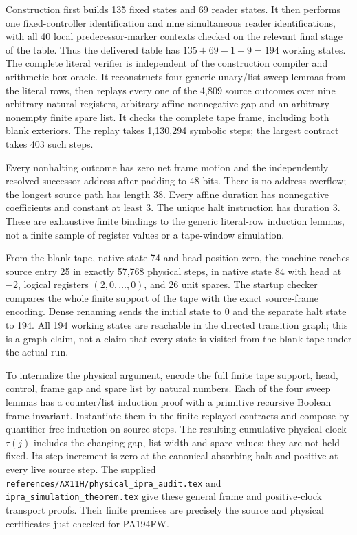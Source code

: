Construction first builds 135 fixed states and 69 reader states.  It
then performs one fixed-controller identification and nine simultaneous
reader identifications, with all 40 local predecessor-marker contexts
checked on the relevant final stage of the table.  Thus the delivered
table has $135+69-1-9=194$ working states.  The complete literal
verifier is independent of the construction compiler and arithmetic-box
oracle.  It reconstructs four generic unary/list sweep lemmas from the
literal rows, then replays every one of the 4,809 source outcomes over
nine arbitrary natural registers, arbitrary affine nonnegative gap and
an arbitrary nonempty finite spare list.  It checks the complete tape
frame, including both blank exteriors.  The replay takes 1,130,294
symbolic steps; the largest contract takes 403 such steps.

Every nonhalting outcome has zero net frame motion and the independently
resolved successor address after padding to 48 bits.  There is no
address overflow; the longest source path has length 38.  Every affine
duration has nonnegative coefficients and constant at least 3.  The
unique halt instruction has duration 3.  These are exhaustive finite
bindings to the generic literal-row induction lemmas, not a finite
sample of register values or a tape-window simulation.

From the blank tape, native state 74 and head position zero, the machine
reaches source entry 25 in exactly 57,768 physical steps, in native
state 84 with head at $-2$, logical registers $(2,0,\ldots,0)$, and 26
unit spares.  The startup checker compares the whole finite support of
the tape with the exact source-frame encoding.  Dense renaming sends
the initial state to 0 and the separate halt state to 194.  All 194
working states are reachable in the directed transition graph; this is
a graph claim, not a claim that every state is visited from the blank
tape under the actual run.

To internalize the physical argument, encode the full finite tape
support, head, control, frame gap and spare list by natural numbers.
Each of the four sweep lemmas has a counter/list induction proof with
a primitive recursive Boolean frame invariant.  Instantiate them in
the finite replayed contracts and compose by quantifier-free induction
on source steps.  The resulting cumulative physical clock $\tau(j)$
includes the changing gap, list width and spare values; they are not
held fixed.  Its step increment is zero at the canonical absorbing halt and positive
at every live source step.  The supplied
\nolinkurl{references/AX11H/physical_ipra_audit.tex} and
\nolinkurl{ipra_simulation_theorem.tex} give these general frame and
positive-clock transport proofs.  Their finite premises are precisely
the source and physical certificates just checked for PA194FW.

